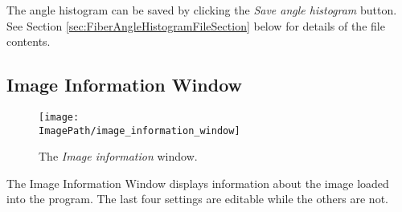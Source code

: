 \documentclass[11pt,titlepage,twoside]{article}
\begin{document}
The angle histogram can be saved by clicking the \emph{Save angle histogram} button. See
Section \ref{sec:FiberAngleHistogramFileSection} below for details of the file contents.

\subsection{Image Information Window}

\begin{figure}[htbp] %
   \centering
   \texttt{[image: \\ImagePath/image\_information\_window]} 
   \caption{The \emph{Image information} window.}
   \label{fig:ImageInformationWindow}
\end{figure}

The Image Information Window displays information about the image loaded into the program. The last four settings are editable while the others are not.
\end{document}
